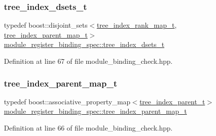 \subsubsection{\texorpdfstring{tree\+\_\+index\+\_\+dsets\+\_\+t}{tree\_index\_dsets\_t}}
{\footnotesize\ttfamily typedef boost\+::disjoint\+\_\+sets$<$\hyperlink{classmodule__register__binding__spec_a8336f338b308445a062ca2f293617f67}{tree\+\_\+index\+\_\+rank\+\_\+map\+\_\+t}, \hyperlink{classmodule__register__binding__spec_a5d303749648df3668e9ccf7c368660cb}{tree\+\_\+index\+\_\+parent\+\_\+map\+\_\+t}$>$ \hyperlink{classmodule__register__binding__spec_a26171ae8c88c4fe1a5397cdd47d417e3}{module\+\_\+register\+\_\+binding\+\_\+spec\+::tree\+\_\+index\+\_\+dsets\+\_\+t}\hspace{0.3cm}{\ttfamily [private]}}



Definition at line 67 of file module\+\_\+binding\+\_\+check.\+hpp.

\mbox{\label{classmodule__register__binding__spec_a5d303749648df3668e9ccf7c368660cb}} 
\subsubsection{\texorpdfstring{tree\+\_\+index\+\_\+parent\+\_\+map\+\_\+t}{tree\_index\_parent\_map\_t}}
{\footnotesize\ttfamily typedef boost\+::associative\+\_\+property\+\_\+map$<$\hyperlink{classmodule__register__binding__spec_a7caa9258582c53bbbb84194770abe960}{tree\+\_\+index\+\_\+parent\+\_\+t}$>$ \hyperlink{classmodule__register__binding__spec_a5d303749648df3668e9ccf7c368660cb}{module\+\_\+register\+\_\+binding\+\_\+spec\+::tree\+\_\+index\+\_\+parent\+\_\+map\+\_\+t}\hspace{0.3cm}{\ttfamily [private]}}



Definition at line 66 of file module\+\_\+binding\+\_\+check.\+hpp.

\mbox{\label{classmodule__register__binding__spec_a7caa9258582c53bbbb84194770abe960}} 
